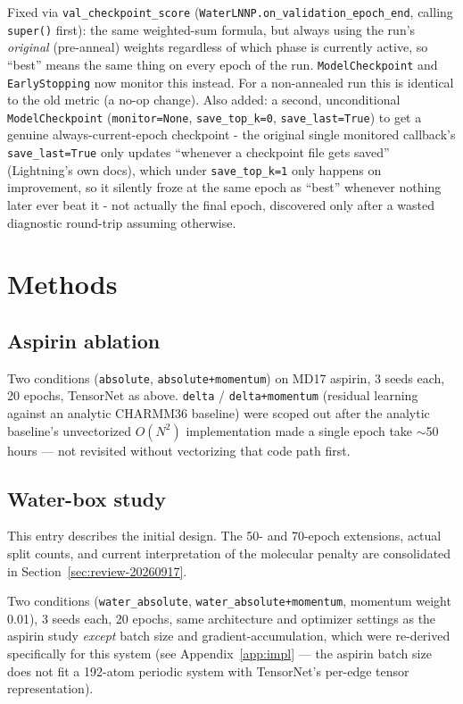 \documentclass[11pt]{article}
\begin{document}
Fixed via \texttt{val\_checkpoint\_score}
(\texttt{WaterLNNP.on\_validation\_epoch\_end}, calling \texttt{super()}
first): the same weighted-sum formula, but always using the run's
\emph{original} (pre-anneal) weights regardless of which phase is currently
active, so ``best'' means the same thing on every epoch of the run.
\texttt{ModelCheckpoint} and \texttt{EarlyStopping} now monitor this instead.
For a non-annealed run this is identical to the old metric (a no-op change).
Also added: a second, unconditional \texttt{ModelCheckpoint}
(\texttt{monitor=None}, \texttt{save\_top\_k=0}, \texttt{save\_last=True}) to
get a genuine always-current-epoch checkpoint - the original single
monitored callback's \texttt{save\_last=True} only updates ``whenever a
checkpoint file gets saved'' (Lightning's own docs), which under
\texttt{save\_top\_k=1} only happens on improvement, so it silently froze at
the same epoch as ``best'' whenever nothing later ever beat it - not
actually the final epoch, discovered only after a wasted diagnostic
round-trip assuming otherwise.

\section{Methods}
\label{sec:methods}

\subsection{Aspirin ablation}
\label{sec:aspirin}

Two conditions (\texttt{absolute}, \texttt{absolute+momentum}) on MD17
aspirin, 3 seeds each, 20 epochs, TensorNet as above. \texttt{delta} /
\texttt{delta+momentum} (residual learning against an analytic CHARMM36
baseline) were scoped out after the analytic baseline's unvectorized
$O(N^2)$ implementation made a single epoch take $\sim$50 hours --- not
revisited without vectorizing that code path first.

\subsection{Water-box study}
\label{sec:waterbox}

This entry describes the initial design. The 50- and 70-epoch extensions,
actual split counts, and current interpretation of the molecular penalty
are consolidated in Section~\ref{sec:review-20260917}.

Two conditions (\texttt{water\_absolute}, \texttt{water\_absolute+momentum},
momentum weight 0.01), 3 seeds each, 20 epochs, same architecture and
optimizer settings as the aspirin study \emph{except} batch size and
gradient-accumulation, which were re-derived specifically for this system
(see Appendix~\ref{app:impl} --- the aspirin batch size does not fit a
192-atom periodic system with TensorNet's per-edge tensor representation).
\end{document}
